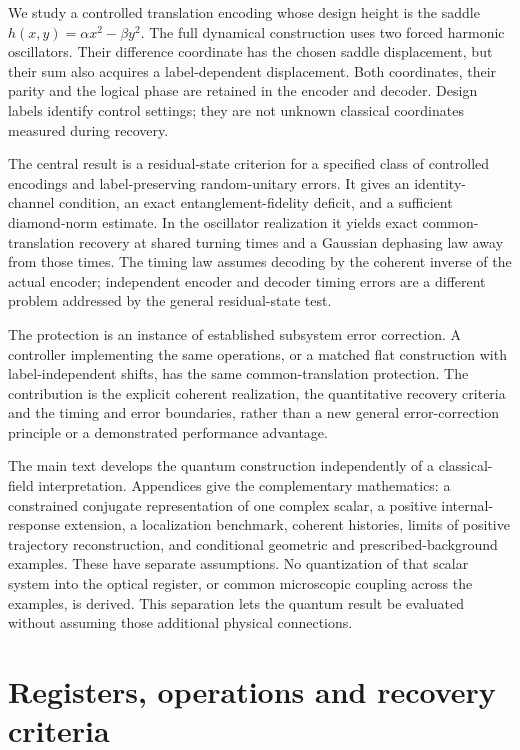 \documentclass[aip,adv,reprint,onecolumn,amsmath,amssymb]{revtex4-2}
\begin{document}
We study a controlled translation encoding whose design height is the saddle $h(x,y)=\alpha x^2-\beta y^2$. The full dynamical construction uses two forced harmonic oscillators. Their difference coordinate has the chosen saddle displacement, but their sum also acquires a label-dependent displacement. Both coordinates, their parity and the logical phase are retained in the encoder and decoder. Design labels identify control settings; they are not unknown classical coordinates measured during recovery.

The central result is a residual-state criterion for a specified class of controlled encodings and label-preserving random-unitary errors. It gives an identity-channel condition, an exact entanglement-fidelity deficit, and a sufficient diamond-norm estimate. In the oscillator realization it yields exact common-translation recovery at shared turning times and a Gaussian dephasing law away from those times. The timing law assumes decoding by the coherent inverse of the actual encoder; independent encoder and decoder timing errors are a different problem addressed by the general residual-state test.

The protection is an instance of established subsystem error correction.\cite{kribs} A controller implementing the same operations, or a matched flat construction with label-independent shifts, has the same common-translation protection. The contribution is the explicit coherent realization, the quantitative recovery criteria and the timing and error boundaries, rather than a new general error-correction principle or a demonstrated performance advantage.

The main text develops the quantum construction independently of a classical-field interpretation. Appendices give the complementary mathematics: a constrained conjugate representation of one complex scalar, a positive internal-response extension, a localization benchmark, coherent histories, limits of positive trajectory reconstruction, and conditional geometric and prescribed-background examples. These have separate assumptions. No quantization of that scalar system into the optical register, or common microscopic coupling across the examples, is derived. This separation lets the quantum result be evaluated without assuming those additional physical connections.

\section{Registers, operations and recovery criteria}
\label{sec:registers}
\end{document}
